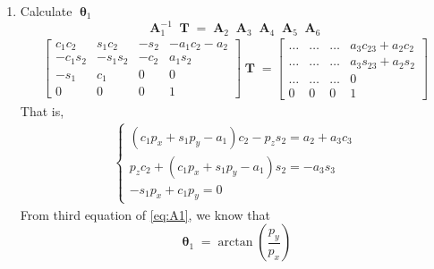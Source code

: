 \documentclass[12pt]{article}
\DeclareMathOperator{\A}{\mathbf{A}}
\DeclareMathOperator{\T}{\mathbf{T}}
\DeclareMathOperator{\Th}{\mathbf{\theta}}
\begin{document}
\begin{enumerate}
  \item Calculate $\Th_1$\\
    $$\A_1^{-1}\T = \A_2\A_3\A_4\A_5\A_6$$
    \begin{align*}
      \begin{bmatrix}
        c_1c_2 & s_1c_2 & -s_2 & -a_1c_2-a_2\\
        -c_1s_2 & -s_1s_2 & -c_2 & a_1s_2\\
        -s_1 & c_1 & 0 & 0\\
        0 & 0 & 0 & 1
      \end{bmatrix}\T = 
      \begin{bmatrix}
        \dots & \dots & \dots & a_3c_{23} + a_2c_2\\
        \dots & \dots & \dots & a_3s_{23} + a_2s_2\\
        \dots & \dots & \dots & 0\\
        0 & 0 & 0 & 1
      \end{bmatrix}
    \end{align*}
    That is,
    \begin{align} \label{eq:A1}
      \begin{cases}
        (c_1p_x + s_1p_y - a_1)c_2 - p_zs_2 = a_2 + a_3c_3\\
        p_zc_2 + (c_1p_x + s_1p_y - a_1)s_2 = -a_3s_3\\
        -s_1p_x + c_1p_y = 0
      \end{cases}
    \end{align}
    From third equation of \ref{eq:A1}, we know that
    $$\Th_1 = \arctan(\frac{p_y}{p_x})$$


\end{enumerate}
\end{document}
